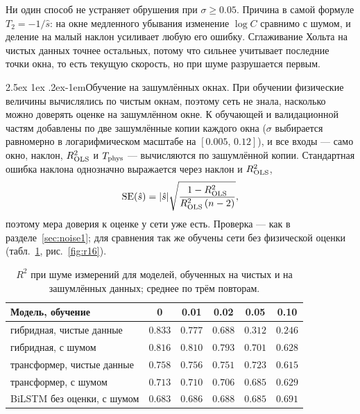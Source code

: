 \documentclass[12pt,a4paper]{report}
\makeatletter
\renewcommand\paragraph{\@startsection{paragraph}{4}{\z@}%
  {2.5ex \@plus1ex \@minus.2ex}{-1em}{\normalfont\normalsize\bfseries}}
\numberwithin{equation}{chapter}
\makeatother
\begin{document}
Ни один способ не устраняет обрушения при $\sigma\ge0.05$. Причина в самой
формуле $T_2=-1/\hat s$: на окне медленного убывания изменение $\log C$
сравнимо с шумом, и деление на малый наклон усиливает любую его ошибку.
Сглаживание Хольта на чистых данных точнее остальных, потому что сильнее
учитывает последние точки окна, то есть текущую скорость, но при шуме
разрушается первым.

\paragraph{Обучение на зашумлённых окнах.} При обучении физические
величины вычислялись по чистым окнам, поэтому сеть не знала, насколько
можно доверять оценке на зашумлённом окне. К обучающей и валидационной
частям добавлены по две зашумлённые копии каждого окна ($\sigma$ выбирается
равномерно в логарифмическом масштабе на $[0.005,\,0.12]$), и все входы ---
само окно, наклон, $R^2_{\rm OLS}$ и $T_{\rm phys}$ --- вычисляются по
зашумлённой копии. Стандартная ошибка наклона однозначно выражается через
наклон и $R^2_{\rm OLS}$,
\[
\mathrm{SE}(\hat s)=|\hat s|\sqrt{\frac{1-R^2_{\rm OLS}}{R^2_{\rm OLS}\,(n-2)}},
\]
поэтому мера доверия к оценке у сети уже есть. Проверка --- как в
разделе~\ref{sec:noise1}; для сравнения так же обучены сети без физической
оценки (табл.~\ref{tab:r16}, рис.~\ref{fig:r16}).

\begin{table}[h]
\centering
\caption{$R^2$ при шуме измерений для моделей, обученных на чистых и на
зашумлённых данных; среднее по трём повторам.}
\label{tab:r16}
\small
\begin{tabular}{@{}lccccc@{}}
\toprule
Модель, обучение & 0 & 0.01 & 0.02 & 0.05 & 0.10 \\
\midrule
гибридная, чистые данные & $\mathbf{0.833}$ & $0.777$ & $0.688$ & $0.312$ & $0.246$ \\
гибридная, с шумом & $0.816$ & $\mathbf{0.810}$ & $\mathbf{0.793}$ & $0.701$ & $0.628$ \\
трансформер, чистые данные & $0.758$ & $0.756$ & $0.751$ & $\mathbf{0.723}$ & $0.615$ \\
трансформер, с шумом & $0.713$ & $0.710$ & $0.706$ & $0.685$ & $\mathbf{0.629}$ \\
BiLSTM без оценки, с шумом & $0.683$ & $0.686$ & $0.688$ & $0.685$ & $\mathbf{0.691}$ \\
\bottomrule
\end{tabular}
\end{table}
\end{document}
